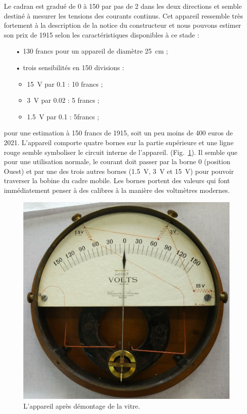 \documentclass[12pt,a4paper,fleqn]{article}
\begin{document}
Le cadran est gradué de 0 à 150 par pas de 2 dans les deux directions et semble destiné à mesurer les tensions des courants continus.
Cet appareil ressemble très fortement à la description de la notice du constructeur et nous pouvons estimer son prix de 1915 selon les caractéristiques disponibles à ce stade :
\begin{itemize}
\item[•] 130 francs pour un appareil de diamètre \SI{25}{\centi\metre} ;
\item[•] trois sensibilités en 150 divisions :
\begin{itemize}
\item \SI{15}{V} par \num{0.1} : 10 francs ;
\item \SI{3}{V} par \num{0.02} : 5 francs ;
\item \SI{1.5}{V} par \num{0.1} : 5francs ;
\end{itemize}
\end{itemize}
pour une estimation à 150 francs de 1915,  soit un peu moins de 400 euros de 2021.
L'appareil comporte quatre \og bornes \fg{} sur la partie supérieure et une ligne rouge semble symboliser le circuit interne de l'appareil. (Fig.~\ref{fig:galva_volt_glass}).
Il semble que pour une utilisation normale, le courant doit passer par la borne 0 (position Ouest) et par une des trois autres bornes (\SI{1.5}{V}, \SI{3}{V} et \SI{15}{V}) pour pouvoir traverser la bobine du cadre mobile.
Les bornes portent des valeurs qui font immédiatement penser à des calibres à la manière des voltmètres modernes.
\begin{figure}
    \center
    \includegraphics[height=300 pt]{images/20210205_152634.jpg}
    \caption{L'appareil après démontage de la vitre.}
    \label{fig:galva_volt_glass}
\end{figure}
\end{document}
